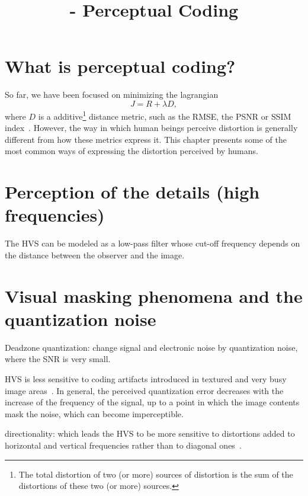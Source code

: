 

\title{\SM{} - Perceptual Coding}

\maketitle
\tableofcontents

\section{What is perceptual coding?}

So far, we have been focused on minimizing the lagrangian
\begin{equation}
  J = R + \lambda D,
\end{equation}
where $D$ is a additive\footnote{The total distortion of two (or more)
sources of distortion is the sum of the distortions of these two (or
more) sources.} distance metric, such as the RMSE, the PSNR or SSIM
index~\cite{wang2004image}. However, the way in which human beings
perceive distortion is generally different from how these metrics
express it. This chapter presents some of the most common ways of
expressing the distortion perceived by humans.

\section{Perception of the details (high frequencies)}
The HVS can be modeled as a low-pass filter whose cut-off frequency
depends on the distance between the observer and the image.

\section{Visual masking phenomena and the quantization noise}
Deadzone quantization: change signal and electronic noise by
quantization noise, where the SNR is very small.

HVS is less sensitive to coding artifacts introduced in textured and
very busy image areas~\cite{wu2017digital}. In general, the perceived
quantization error decreases with the increase of the frequency of the
signal, up to a point in which the image contents mask the noise,
which can become imperceptible.

directionality: which leads the HVS to be more sensitive to
distortions added to horizontal and vertical frequencies rather than
to diagonal ones~\cite{naccari2014perceptually}.


